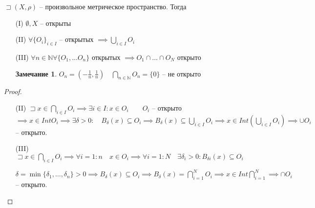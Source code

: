 \documentclass{book}
\newcommand\N{\ensuremath{\mathbb{N}}}
\renewcommand\O{\ensuremath{\emptyset}}
\theoremstyle{definition}
\newtheorem*{note}{Замечание}
\begin{document}
    \begin{theorem}

        $\sqsupset (X, \rho)$ -- произвольное метрическое пространство. 
        Тогда 
        \begin{enumerate}
            \item [(I)]$\O , X$ -- открыты
            \item [(II)] $\forall  \{O_i\}_{i\in I}$ -- открытых $ \implies  \bigcup\limits_{i \in  I} O_i$
            \item [(III)] $\forall n\in \N \forall \{O_1, \ldots O_n\}$ открытых $\implies  O_1\cap \ldots \cap O_N$ открыто

            \begin{note}
                $O_n = \left( -\frac{1}{n}, \frac{1}{n} \right) \quad \bigcap\limits_{n\in \N } O_n = \{0\}$ -- не открыто
            \end{note}
        \end{enumerate}
    \end{theorem}
    \begin{proof}
        \begin{itemize}
            \item [(II)] $\sqsupset x\in \bigcap\limits_{i \in  I} O_i \implies  \exists i\in I: x\in O_i\qquad O_i$ -- открыто $\implies x\in Int O_i \implies  \exists \delta >0:\quad B_{\delta}(x) \subseteq O_i \implies  B_{\delta}(x) \subseteq \bigcup\limits_{i \in  I}  O_i \implies  x\in Int\left( \bigcup\limits_{i \in  I} O_i \right)  \implies  \cup O_i$ -- открыто.
            \item [(III)] $\sqsupset x\in \bigcap\limits_{i \in  I} O_i \implies \forall i = 1:n\quad x\in O_i \implies  \forall i = 1:N\quad \exists \delta_i>0: B_{\delta i}(x) \subseteq O_i$

            $\delta = \min \{\delta_1, \ldots, \delta_n\} >0 \implies  B_{\delta}(x) \subseteq O_i \implies  B_{\delta}(x) = \bigcap\limits_{i=1} ^N O_i \implies  x\in Int \bigcap\limits_{i =1}^N \implies \cap O_i $ -- открыто.
        \end{itemize}
    \end{proof}
\end{document}
